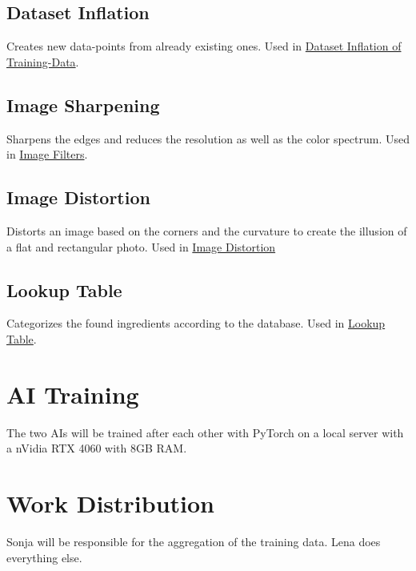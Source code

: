 \documentclass[a4paper,11pt]{report}
\begin{document}
            \subsection{Dataset Inflation}
                Creates new data-points from already existing ones. Used in \hyperref[subsec:data:inflation]{Dataset Inflation of Training-Data}.

            \subsection{Image Sharpening}
                Sharpens the edges and reduces the resolution as well as the color spectrum. Used in \hyperref[subsec:architecture:filters]{Image Filters}.

            \subsection{Image Distortion}
                Distorts an image based on the corners and the curvature to create the illusion of a flat and rectangular photo. Used in \hyperref[subsec:architecture:distortion]{Image Distortion}

            \subsection{Lookup Table}
                Categorizes the found ingredients according to the database. Used in \hyperref[subsec:architecture:table]{Lookup Table}.

        \section{AI Training}
            The two AIs will be trained after each other with PyTorch \cite{pytorch} on a local server with a nVidia RTX 4060 with 8GB RAM.

        \section{Work Distribution}
            Sonja will be responsible for the aggregation of the training data. Lena does everything else.



    \printbibliography
\end{document}
